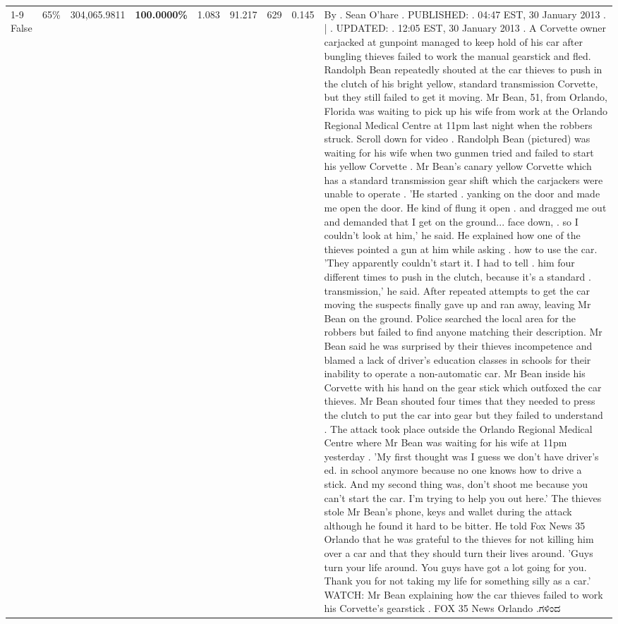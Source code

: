 \begin{table}[H]
\begin{tabular}{lllrlllll}
\cline{1-9} \cline{2-9}
False & 65\% & 304,065.9811 & \bfseries \color{red} 100.0000\% & 1.083 & 91.217 & 629 & 0.145 & By . Sean O'hare . PUBLISHED: . 04:47 EST, 30 January 2013 . | . UPDATED: . 12:05 EST, 30 January 2013 . A Corvette owner carjacked at gunpoint managed to keep hold of his car after bungling thieves failed to work the manual gearstick and fled. Randolph Bean repeatedly shouted at the car thieves to push in the clutch of his bright yellow, standard transmission Corvette, but they still failed to get it moving. Mr Bean, 51, from Orlando, Florida was waiting to pick up his wife from work at the Orlando Regional Medical Centre at 11pm last night when the robbers struck. Scroll down for video . Randolph Bean (pictured) was waiting for his wife when two gunmen tried and failed to start his yellow Corvette . Mr Bean's canary yellow Corvette which has a standard transmission gear shift which the carjackers were unable to operate . 'He started . yanking on the door and made me open the door. He kind of flung it open . and dragged me out and demanded that I get on the ground... face down, . so I couldn't look at him,' he said. He explained how one of the thieves pointed a gun at him while asking . how to use the car. 'They apparently couldn't start it. I had to tell . him four different times to push in the clutch, because it's a standard . transmission,' he said. After repeated attempts to get the car moving the suspects finally gave up and ran away, leaving Mr Bean on the ground. Police searched the local area for the robbers but failed to find anyone matching their description. Mr Bean said he was surprised by their thieves incompetence and blamed a lack of driver's education classes in schools for their inability to operate a non-automatic car. Mr Bean inside his Corvette with his hand on the gear stick which outfoxed the car thieves. Mr Bean shouted four times that they needed to press the clutch to put the car into gear but they failed to understand . The attack took place outside the Orlando Regional Medical Centre where Mr Bean was waiting for his wife at 11pm yesterday . 'My first thought was I guess we don't have driver's ed. in school anymore because no one knows how to drive a stick. And my second thing was, don't shoot me because you can't start the car. I'm trying to help you out here.' The thieves stole Mr Bean's phone, keys and wallet during the attack although he found it hard to be bitter. He told Fox News 35 Orlando that he was grateful to the thieves for not killing him over a car and that they should turn their lives around. 'Guys turn your life around. You guys have got a lot going for you. Thank you for not taking my life for something silly as a car.' WATCH: Mr Bean explaining how the car thieves failed to work his Corvette's gearstick . FOX 35 News Orlando .ಗಳಿಂದ \\

\end{tabular}
\end{table}
